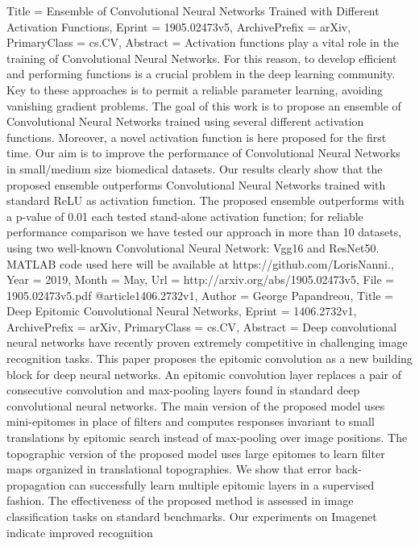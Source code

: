 {{{{Title         = {Ensemble of Convolutional Neural Networks Trained with Different
  Activation Functions},
Eprint        = {1905.02473v5},
ArchivePrefix = {arXiv},
PrimaryClass  = {cs.CV},
Abstract      = {Activation functions play a vital role in the training of Convolutional
Neural Networks. For this reason, to develop efficient and performing functions
is a crucial problem in the deep learning community. Key to these approaches is
to permit a reliable parameter learning, avoiding vanishing gradient problems.
The goal of this work is to propose an ensemble of Convolutional Neural
Networks trained using several different activation functions. Moreover, a
novel activation function is here proposed for the first time. Our aim is to
improve the performance of Convolutional Neural Networks in small/medium size
biomedical datasets. Our results clearly show that the proposed ensemble
outperforms Convolutional Neural Networks trained with standard ReLU as
activation function. The proposed ensemble outperforms with a p-value of 0.01
each tested stand-alone activation function; for reliable performance
comparison we have tested our approach in more than 10 datasets, using two
well-known Convolutional Neural Network: Vgg16 and ResNet50. MATLAB code used
here will be available at https://github.com/LorisNanni.},
Year          = {2019},
Month         = {May},
Url           = {http://arxiv.org/abs/1905.02473v5},
File          = {1905.02473v5.pdf}
}
@article{1406.2732v1,
Author        = {George Papandreou},
Title         = {Deep Epitomic Convolutional Neural Networks},
Eprint        = {1406.2732v1},
ArchivePrefix = {arXiv},
PrimaryClass  = {cs.CV},
Abstract      = {Deep convolutional neural networks have recently proven extremely competitive
in challenging image recognition tasks. This paper proposes the epitomic
convolution as a new building block for deep neural networks. An epitomic
convolution layer replaces a pair of consecutive convolution and max-pooling
layers found in standard deep convolutional neural networks. The main version
of the proposed model uses mini-epitomes in place of filters and computes
responses invariant to small translations by epitomic search instead of
max-pooling over image positions. The topographic version of the proposed model
uses large epitomes to learn filter maps organized in translational
topographies. We show that error back-propagation can successfully learn
multiple epitomic layers in a supervised fashion. The effectiveness of the
proposed method is assessed in image classification tasks on standard
benchmarks. Our experiments on Imagenet indicate improved recognition
}}}}}
